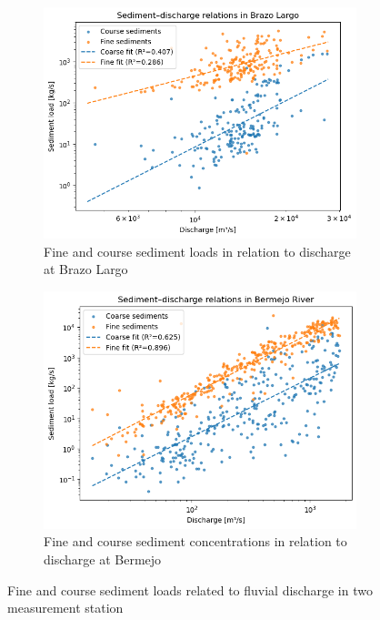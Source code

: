 \begin{figure}[h!]
    \centering
    \begin{subfigure}[b]{0.48\linewidth}
        \centering
        \includegraphics[width=\linewidth]{figures/ch5/discharge sediment brazo largo.png}
        \caption{Fine and course sediment loads in relation to discharge at Brazo Largo}
        \label{fig:discharge sediment brazo}
    \end{subfigure}
    \hfill
    \begin{subfigure}[b]{0.48\linewidth}
        \centering
        \includegraphics[width=\linewidth]{figures/ch5/discharge sediment bermejo.png}
        \caption{Fine and course sediment concentrations in relation to discharge at Bermejo}
        \label{fig:discharge sediment bermejo}
    \end{subfigure}
    
    \caption{Fine and course sediment loads related to fluvial discharge in two measurement station}
    \label{fig:sediment loads and discharge}
\end{figure}



